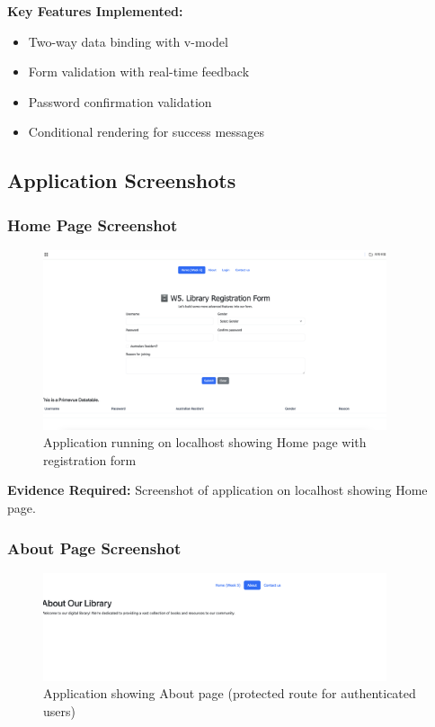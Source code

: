 \documentclass[11pt,a4paper]{article}
\begin{document}
\textbf{Key Features Implemented:}
\begin{itemize}
    \item Two-way data binding with v-model
    \item Form validation with real-time feedback
    \item Password confirmation validation
    \item Conditional rendering for success messages
\end{itemize}

\newpage

\subsection{Application Screenshots}

\subsubsection{Home Page Screenshot}

\begin{figure}[h]
     \centering
     \includegraphics[width=0.9\textwidth]{home_page_localhost.png}
     \caption{Application running on localhost showing Home page with registration form}
     \label{fig:home_page}
\end{figure}

\textbf{Evidence Required:} Screenshot of application on localhost showing Home page.

\subsubsection{About Page Screenshot}

\begin{figure}[h]
     \centering
     \includegraphics[width=0.9\textwidth]{about_page_localhost.png}
     \caption{Application showing About page (protected route for authenticated users)}
     \label{fig:about_page}
\end{figure}
\end{document}
